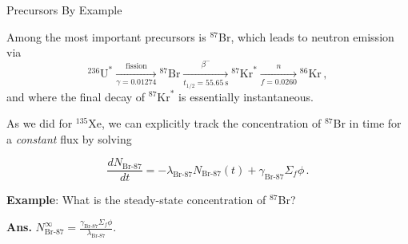 \documentclass[aspectratio=1610]{beamer}
\begin{document}

\begin{frame}[fragile]{Precursors By Example}

Among the most important precursors is ${}^{87}$Br, which leads to neutron emission via
\begin{equation*}
   {}^{236}\text{U}^* \xrightarrow[\gamma = 0.01274]{\text{fission}}
     {}^{87}\text{Br} \xrightarrow[t_{1/2}=55.65~\text{s}]{\beta^{-}} 
     {}^{87}\text{Kr}^*  \xrightarrow[f = 0.0260]{n} {}^{86}\text{Kr} \, ,
\end{equation*}
and where the final decay of ${}^{87}\text{Kr}^*$ is essentially instantaneous.

\vfill 

As we did for ${}^{135}$Xe, we can explicitly track the concentration of ${}^{87}$Br in time for a {\it constant} flux by solving

\begin{equation*}
\tag{27.1}
  \frac{d N_{\text{Br-87}}}{dt} = -\lambda_{\text{Br-87}} N_{\text{Br-87}}(t) + \gamma_{\text{Br-87}} \Sigma_f \phi \, .
\end{equation*}

{\bf Example}: What is the steady-state concentration of ${}^{87}$Br? 
\pause 

\textcolor{wcprimary}{
{\bf Ans.} $N^{\infty}_{\text{Br-87}} = \frac{\gamma_{\text{Br-87}} \Sigma_f \phi}{\lambda_{\text{Br-87}}}$.
}

\end{frame}



\end{document}
